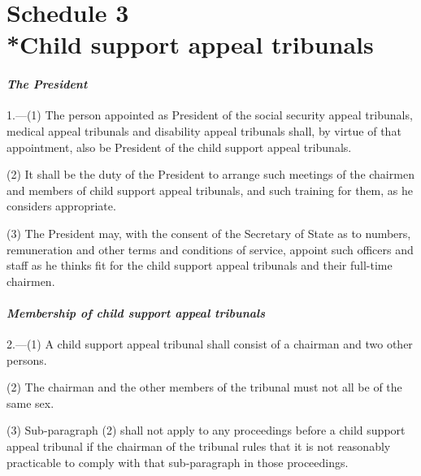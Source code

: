 \documentclass[12pt,a4paper]{article}
\begin{document}
\part[Schedule 3 --- Child support appeal tribunals]{Schedule 3\\*Child support appeal tribunals}

\renewcommand\parthead{--- Schedule 3}


\subsection*{\itshape The President}

1.---(1) The person appointed 
as President of the social security appeal tribunals, medical appeal tribunals and disability appeal tribunals shall, by virtue of that appointment, also be President of the child support appeal tribunals.

(2) It shall be the duty of the President to arrange such meetings of the chairmen and members of child support appeal tribunals, and such training for them, as he considers appropriate.

(3) The President may, with the consent of the Secretary of State as to numbers, remuneration and other terms and conditions of service, appoint such officers and staff as he thinks fit for the child support appeal tribunals and their full-time chairmen.


\subsection*{\itshape Membership of child support appeal tribunals}

2.---(1) A child support appeal tribunal shall consist of a chairman and two other persons.

(2) The chairman and the other members of the tribunal must not all be of the same sex.

(3) Sub-paragraph (2)  shall not apply to any proceedings before a child support appeal tribunal if the chairman of the tribunal rules that it is not reasonably practicable to comply with that sub-paragraph in those proceedings.
\end{document}
